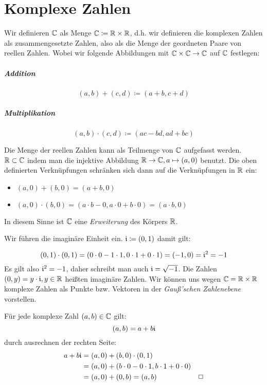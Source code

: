 \chapter{Komplexe Zahlen}
Wir definieren $\mathbb{C}$ als Menge $\mathbb{C}\coloneqq\mathbb{R}\times\mathbb{R}$, d.h. wir definieren die komplexen Zahlen als zusammengesetzte Zahlen, also als die Menge der geordneten Paare von reellen Zahlen.
Wobei wir folgende Abbildungen mit $\mathbb{C}\times\mathbb{C}\rightarrow\mathbb{C}$ auf $\mathbb{C}$ festlegen:
\paragraph{Addition}
\begin{equation*}
  (a,b) + (c,d) \coloneqq (a+b,c+d)
\end{equation*}
\paragraph{Multiplikation}
\begin{equation*}
  (a,b) \cdot (c,d) \coloneqq (ac-bd,ad+bc)
\end{equation*}

\bemerkung
Die Menge der reellen Zahlen kann als Teilmenge von $\mathbb{C}$ aufgefasst werden. $\mathbb{R}\subset\mathbb{C}$ indem man die injektive Abbildung $\mathbb{R}\rightarrow\mathbb{C}, a\mapsto (a,0)$ benutzt. Die oben definierten Verknüpfungen schränken sich dann auf die Verknüpfungen in $\mathbb{R}$ ein:
\begin{itemize}
  \item $(a,0)+(b,0)=(a+b,0)$
  \item $(a,0)\cdot(b,0)=(a\cdot b - 0, a\cdot 0+ b\cdot 0) = (a\cdot b,0)$
\end{itemize}
In diesem Sinne ist $\mathbb{C}$ eine \emph{Erweiterung} des Körpers $\mathbb{R}$.

Wir führen die imaginäre Einheit ein.
$\mathfrak{i}\coloneqq (0,1)$ damit gilt:

\begin{equation*}
  (0,1)\cdot(0,1) = (0\cdot0 -1\cdot1,0\cdot1+0\cdot1)=(-1,0)=\mathfrak{i}^2=-1
\end{equation*}
Es gilt also $\mathfrak{i}^2=-1$, daher schreibt man auch $\mathfrak{i}=\sqrt{-1}$. Die Zahlen $(0,y)=y\cdot\mathfrak{i}, y\in\mathbb{R}$ heißten imaginäre Zahlen.
Wir können uns wegen $\mathbb{C}=\mathbb{R}\times\mathbb{R}$ komplexe Zahlen als Punkte bzw. Vektoren in der \emph{Gauß'schen Zahlenebene} vorstellen.

\satz{}
Für jede komplexe Zahl $(a,b)\in\mathbb{C}$ gilt:
\begin{equation*}
  (a,b)=a+b\mathfrak{i}
\end{equation*}
\beweis durch ausrechnen der rechten Seite:
\begin{align*}
  a+b\mathfrak{i} &= (a,0)+(b,0)\cdot(0,1)\\
  &=(a,0)+(b\cdot0-0\cdot1,b\cdot1+0\cdot0)\\
  &=(a,0)+(0,b)=(a,b) &\Box
\end{align*}

